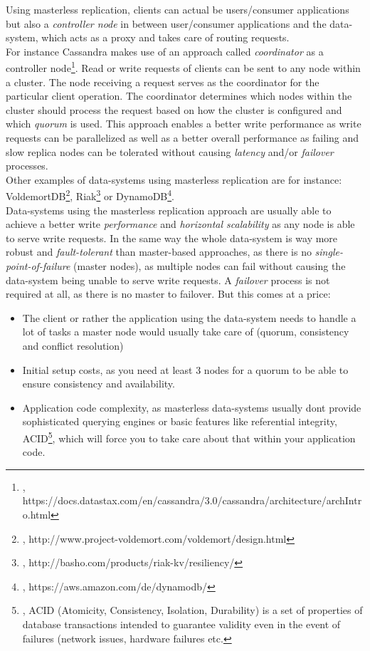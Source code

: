 {Using masterless replication, clients can actual be users/consumer applications but also a \textit{controller node} in between user/consumer applications and the data-system, which acts as a proxy and takes care of routing requests.\\
For instance Cassandra makes use of an approach called \textit{coordinator} as a controller node\footnote{\cite{CASAR}, https://docs.datastax.com/en/cassandra/3.0/cassandra/architecture/archIntro.html}. Read or write requests of clients can be sent to any node within a cluster. The node receiving a request serves as the coordinator for the particular client operation. The coordinator determines which nodes within the cluster should process the request based on how the cluster is configured and which \textit{quorum} is used. This approach enables a better write performance as write requests can be parallelized as well as a better overall performance as failing and slow replica nodes can be tolerated without causing \textit{latency} and/or \textit{failover} processes. \\Other examples of data-systems using masterless replication are for instance: VoldemortDB\footnote{\cite{VOLDML}, http://www.project-voldemort.com/voldemort/design.html}, Riak\footnote{\cite{RIAKML}, http://basho.com/products/riak-kv/resiliency/} or DynamoDB\footnote{\cite{DYNML}, https://aws.amazon.com/de/dynamodb/}.\\
Data-systems using the masterless replication approach are usually able to achieve a better write \textit{performance} and \textit{horizontal scalability} as any node is able to serve write requests. In the same way the whole data-system is way more robust and \textit{fault-tolerant} than master-based approaches, as there is no \textit{single-point-of-failure} (master nodes), as multiple nodes can fail without causing the data-system being unable to serve write requests. A \textit{failover} process is not required at all, as there is no master to failover. But this comes at a price: \\
\begin{itemize}
\item The client or rather the application using the data-system needs to handle a lot of tasks a master node would usually take care of (quorum, consistency and conflict resolution)
\item Initial setup costs, as you need at least 3 nodes for a quorum to be able to ensure consistency and availability.
\item Application code complexity, as masterless data-systems usually dont provide sophisticated querying engines or basic features like referential integrity, ACID\footnote{\cite{ACID}, ACID (Atomicity, Consistency, Isolation, Durability) is a set of properties of database transactions intended to guarantee validity even in the event of failures (network issues, hardware failures etc.}, which will force you to take care about that within your application code.

\end{itemize}}
